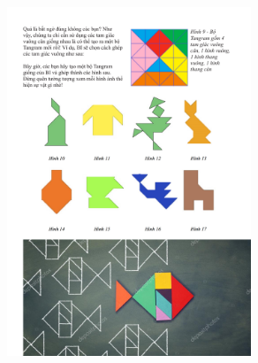 	\begin{figure}[H]
		\vspace*{-5pt}
		\centering
		\includegraphics[width=0.65\textwidth]{cat-10}
		\vspace*{-5pt}
	\end{figure}


